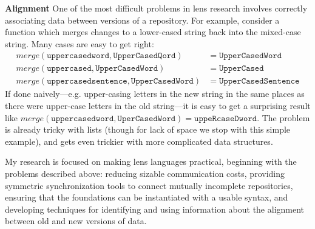 \documentclass{article}
\begin{document}
{\bf Alignment} One of the most difficult problems in lens research involves
correctly associating data between versions of a repository. For example,
consider a function which merges changes to a lower-cased string back into
the mixed-case string. Many cases are easy to get right:
\begin{align*}
    \mathit{merge}(\mathtt{uppercasedword},\mathtt{UpperCasedQord})
        &= \mathtt{UpperCasedWord} \\
    \mathit{merge}(\mathtt{uppercased},\mathtt{UpperCasedWord})
        &= \mathtt{UpperCased} \\
    \mathit{merge}(\mathtt{uppercasedsentence},\mathtt{UpperCasedWord})
        &= \mathtt{UpperCasedSentence}
\end{align*}
If done naively---e.g. upper-casing letters in the new string in the same
places as there were upper-case letters in the old string---it is easy to
get a surprising result like $\mathit{merge}(\mathtt{uppercasedword},
\mathtt{UperCasedWord}) = \mathtt{uppeRcaseDword}$.  The problem is already
tricky with lists (though for lack of space we stop with this simple
example), and gets even trickier with more complicated data structures.

My research is focused on making lens languages practical, beginning with
the problems described above: reducing sizable communication costs,
providing symmetric synchronization tools to connect mutually incomplete
repositories, ensuring that the foundations can be instantiated with a
usable syntax, and developing techniques for identifying and using
information about the alignment between old and new versions of data.
\end{document}
